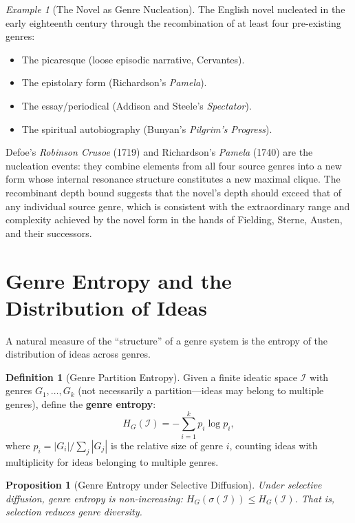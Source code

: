 \documentclass[11pt,openany]{book}
\theoremstyle{definition}
\newtheorem{definition}[axiom]{Definition}
\theoremstyle{plain}
\newtheorem{proposition}[axiom]{Proposition}
\theoremstyle{remark}
\newtheorem{example}[axiom]{Example}
\newcommand{\IS}{\mathcal{I}}               %
\begin{document}
\begin{example}[The Novel as Genre Nucleation]
The English novel nucleated in the early eighteenth century through the recombination of at least four pre-existing genres:
\begin{itemize}
\item The picaresque (loose episodic narrative, Cervantes).
\item The epistolary form (Richardson's \textit{Pamela}).
\item The essay/periodical (Addison and Steele's \textit{Spectator}).
\item The spiritual autobiography (Bunyan's \textit{Pilgrim's Progress}).
\end{itemize}
Defoe's \textit{Robinson Crusoe} (1719) and Richardson's \textit{Pamela} (1740) are the nucleation events: they combine elements from all four source genres into a new form whose internal resonance structure constitutes a new maximal clique. The recombinant depth bound suggests that the novel's depth should exceed that of any individual source genre, which is consistent with the extraordinary range and complexity achieved by the novel form in the hands of Fielding, Sterne, Austen, and their successors.
\end{example}

\section{Genre Entropy and the Distribution of Ideas}

A natural measure of the ``structure'' of a genre system is the entropy of the distribution of ideas across genres.

\begin{definition}[Genre Partition Entropy]
Given a finite ideatic space $\IS$ with genres $G_1, \ldots, G_k$ (not necessarily a partition---ideas may belong to multiple genres), define the \textbf{genre entropy}:
\[
H_G(\IS) = -\sum_{i=1}^{k} p_i \log p_i,
\]
where $p_i = |G_i| / \sum_j |G_j|$ is the relative size of genre $i$, counting ideas with multiplicity for ideas belonging to multiple genres.
\end{definition}

\begin{proposition}[Genre Entropy under Selective Diffusion]
Under selective diffusion, genre entropy is non-increasing: $H_G(\sigma(\IS)) \leq H_G(\IS)$. That is, selection reduces genre diversity.
\end{proposition}
\end{document}
